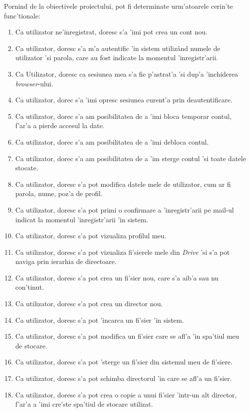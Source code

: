 \documentclass[12pt,a4paper,twoside]{report}
\begin{document}
Pornind de la obiectivele proiectului, pot fi determinate urm'atoarele cerin'te func'tionale:
\begin{enumerate}[label=CF\arabic*]
\item{Ca utilizator ne'inregistrat, doresc s'a 'imi pot crea un cont nou.}
\item{Ca utilizator, doresc s'a m'a autentific 'in sistem utilizând numele de utilizator 'si parola, care au fost indicate la momentul 'inregistr'arii.}
\item{Ca Utilizator, doresc ca sesiunea mea s'a fie p'astrat'a 'si dup'a 'inchiderea \textit{browser}-ului.}
\item{Ca utilizator, dorec s'a 'imi opresc sesiunea curent'a prin deautentificare.}
\item{Ca utilizator, dorec s'a am posibilitatea de a 'imi bloca temporar contul, f'ar'a a pierde accesul la date.}
\item{Ca utilizator, dorec s'a am posibilitatea de a 'imi debloca contul.}
\item{Ca utilizator, dorec s'a am posibilitatea de a 'im sterge contul 'si toate datele stocate.}
\item{Ca utilizator, doresc s'a pot modifica datele mele de utilizator, cum ar fi parola, nume, poz'a de profil.}
\item{Ca utilizator, doresc s'a pot primi o confirmare a 'inregistr'arii pe mail-ul indicat la momentul 'inregistr'arii 'in sistem.}
\item{Ca utilizator, doresc s'a pot vizualiza profilul meu.}
\item{Ca utilizator, doresc s'a pot vizualiza fi'sierele mele din \textit{Drive} 'si s'a pot naviga prin ierarhia de directoare.}
\item{Ca utilizator, doresc s'a pot crea un fi'sier nou, care s'a aib'a sau nu con'tinut.}
\item{Ca utilizator, doresc s'a pot crea un director nou.}
\item{Ca utilizator, doresc s'a pot 'incarca un fi'sier 'in sistem.}
\item{Ca utilizator, doresc s'a pot modifica un fi'sier care se afl'a 'in spa'tiul meu de stocare.}
\item{Ca utilizator, doresc s'a pot 'sterge un fi'sier din sistemul meu de fi'siere.}
\item{Ca utilizator, doresc s'a pot schimba directorul 'in care se afl'a un fi'sier.}
\item{Ca utilizator, doresc s'a pot crea o copie a unui fi'sier 'intr-un alt director, f'ar'a a 'imi cre'ste spa'tiul de stocare utilizat.}

\end{enumerate}
\end{document}
